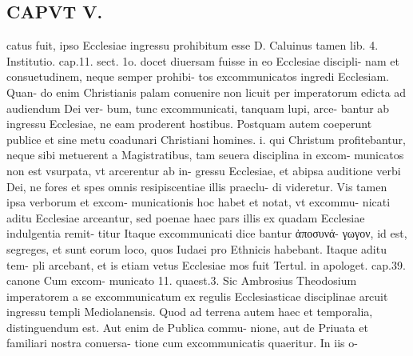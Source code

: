 \documentclass{article}
\begin{document}
\begin{pages}
\section*{CAPVT  V. }\pstart catus fuit, ipso Ecclesiae ingressu prohibitum esse D. Caluinus tamen lib.  4. Institutio. cap.11. sect. 1o. docet diuersam fuisse in eo Ecclesiae discipli- nam et consuetudinem, neque semper prohibi- tos excommunicatos ingredi Ecclesiam. Quan- do enim Christianis palam conuenire non licuit per imperatorum edicta ad audiendum Dei ver- bum, tunc excommunicati, tanquam lupi, arce- bantur ab ingressu Ecclesiae, ne eam proderent hostibus. Postquam autem coeperunt publice et sine metu coadunari Christiani homines. i. qui Christum profitebantur, neque sibi metuerent a Magistratibus, tam seuera disciplina in excom- municatos non est vsurpata, vt arcerentur ab in- gressu Ecclesiae, et abipsa auditione verbi Dei, ne fores et spes omnis resipiscentiae illis praeclu- di videretur. Vis tamen ipsa verborum et excom- municationis hoc habet et notat, vt excommu- nicati aditu Ecclesiae arceantur, sed poenae haec pars illis ex quadam Ecclesiae indulgentia remit- titur Itaque excommunicati dice bantur ἀποσυνά- γωγον, id est, segreges, et sunt eorum loco, quos Iudaei pro Ethnicis habebant. Itaque aditu tem- pli arcebant, et is etiam vetus Ecclesiae mos fuit Tertul. in apologet. cap.39. canone Cum excom- municato 11. quaest.3. Sic Ambrosius Theodosium imperatorem a se excommunicatum ex regulis Ecclesiasticae disciplinae arcuit ingressu templi Mediolanensis. Quod ad terrena autem haec et temporalia, distinguendum est. Aut enim de Publica commu- nione, aut de Priuata et familiari nostra conuersa- tione cum excommunicatis quaeritur. In iis o-  \pend

\end{pages}
\end{document}

